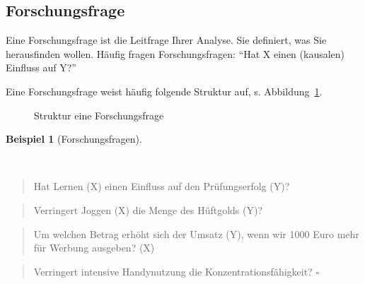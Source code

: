 \documentclass[
  letterpaper,
  twoside,
  open=any]{scrbook}
\theoremstyle{definition}
\theoremstyle{definition}
\newtheorem{example}{Beispiel}[chapter]
\theoremstyle{definition}
\theoremstyle{remark}
\begin{document}
\subsection{Forschungsfrage}\label{forschungsfrage}

Eine Forschungsfrage ist die Leitfrage Ihrer Analyse. Sie definiert, was
Sie herausfinden wollen. Häufig fragen Forschungsfragen: \enquote{Hat X
einen (kausalen) Einfluss auf Y?}

Eine Forschungsfrage weist häufig folgende Struktur auf, s.
Abbildung~\ref{fig-fo-struktur}.

\begin{figure}


\caption{\label{fig-fo-struktur}Struktur eine Forschungsfrage}

\end{figure}%

\begin{example}[Forschungsfragen]\protect\hypertarget{exm-fofrage1}{}\label{exm-fofrage1}

~

\begin{quote}
Hat Lernen (X) einen Einfluss auf den Prüfungserfolg (Y)?
\end{quote}

\begin{quote}
Verringert Joggen (X) die Menge des Hüftgolds (Y)?
\end{quote}

\begin{quote}
Um welchen Betrag erhöht sich der Umsatz (Y), wenn wir 1000 Euro mehr
für Werbung ausgeben? (X)
\end{quote}

\begin{quote}
Verringert intensive Handynutzung die Konzentrationsfähigkeit?
\(\square\)
\end{quote}

\end{example}
\end{document}
